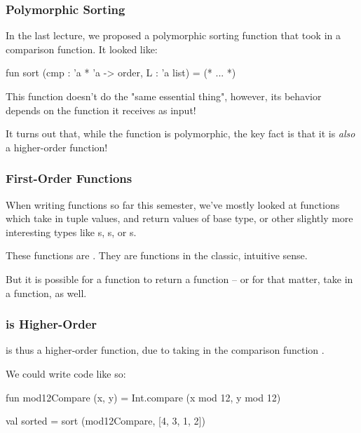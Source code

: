 \documentclass[aspectratio=169, handout]{beamer}
\begin{document}
\begin{frame}[fragile]
  \frametitle{Polymorphic Sorting}

  In the last lecture, we proposed a polymorphic sorting function that took in a
  comparison function. It looked like:

  \pause
  \vspace{\fill}

  \begin{codeblock}
    fun sort (cmp : 'a * 'a -> order, L : 'a list) = (* ... *)
  \end{codeblock}

  \pause
  \vspace{\fill}

  This  function doesn't do the "same essential thing", however,
  its behavior depends on the  function it receives as input!

  \pause
  \vspace{\fill}

  It turns out that, while the  function is polymorphic, the key
  fact is that it is \textit{also} a higher-order function!
\end{frame}

\begin{frame}[fragile]
  \frametitle{First-Order Functions}

  When writing functions so far this semester, we've mostly looked at functions which take
  in tuple values, and return values of base type, or other slightly more interesting types
  like s, s, or s.

  \pause
  \vspace{\fill}

  These functions are . They are functions in the classic, intuitive sense.

  \pause
  \vspace{\fill}

  But it is possible for a function to return a function -- or for that matter, take in a
  function, as well.

  \pause
  \vspace{\fill}

\end{frame}

\begin{frame}[fragile]
  \frametitle{ is Higher-Order}

   is thus a higher-order function, due to taking in the comparison function
  .

  \pause
  \vspace{\fill}

  We could write code like so:

  \begin{codeblock}
    fun mod12Compare (x, y) = Int.compare (x mod 12, y mod 12)

    val sorted = sort (mod12Compare, [4, 3, 1, 2])
  \end{codeblock}
\end{frame}
\end{document}
